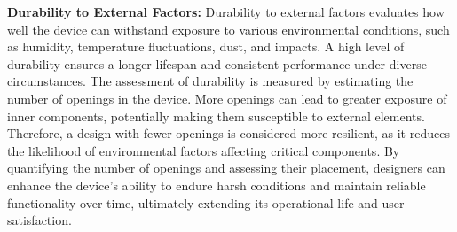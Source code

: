 \textbf{Durability to External Factors:} Durability to external factors evaluates how well the device can withstand exposure to various environmental conditions, such as humidity, temperature fluctuations, dust, and impacts. A high level of durability ensures a longer lifespan and consistent performance under diverse circumstances. The assessment of durability is measured by estimating the number of openings in the device. More openings can lead to greater exposure of inner components, potentially making them susceptible to external elements. Therefore, a design with fewer openings is considered more resilient, as it reduces the likelihood of environmental factors affecting critical components. By quantifying the number of openings and assessing their placement, designers can enhance the device's ability to endure harsh conditions and maintain reliable functionality over time, ultimately extending its operational life and user satisfaction.



